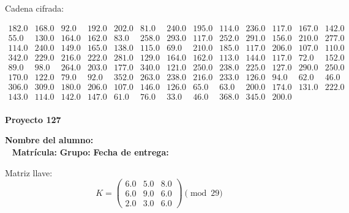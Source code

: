 \documentclass[12pt]{article}
\begin{document}
Cadena cifrada:
\begin{center}
$\begin{array}{lllllllllllll}
182.0 & 168.0 & 92.0 & 192.0 & 202.0 & 81.0 & 240.0 & 195.0 & 114.0 & 236.0 & 117.0 & 167.0 & 142.0\\
55.0 & 130.0 & 164.0 & 162.0 & 83.0 & 258.0 & 293.0 & 117.0 & 252.0 & 291.0 & 156.0 & 210.0 & 277.0\\
114.0 & 240.0 & 149.0 & 165.0 & 138.0 & 115.0 & 69.0 & 210.0 & 185.0 & 117.0 & 206.0 & 107.0 & 110.0\\
342.0 & 229.0 & 216.0 & 222.0 & 281.0 & 129.0 & 164.0 & 162.0 & 113.0 & 144.0 & 117.0 & 72.0 & 152.0\\
89.0 & 98.0 & 264.0 & 203.0 & 177.0 & 340.0 & 121.0 & 250.0 & 238.0 & 225.0 & 127.0 & 290.0 & 250.0\\
170.0 & 122.0 & 79.0 & 92.0 & 352.0 & 263.0 & 238.0 & 216.0 & 233.0 & 126.0 & 94.0 & 62.0 & 46.0\\
306.0 & 309.0 & 180.0 & 206.0 & 107.0 & 146.0 & 126.0 & 65.0 & 63.0 & 200.0 & 174.0 & 131.0 & 222.0\\
143.0 & 114.0 & 142.0 & 147.0 & 61.0 & 76.0 & 33.0 & 46.0 & 368.0 & 345.0 & 200.0\\
\end{array}$
\end{center}

\newpage


\textbf{Proyecto 127}

\textbf{Nombre del alumno:} \underline{\hspace{13cm}}\\\
\vspace{1cm}
\textbf{Matrícula:} \underline{\hspace{4cm}} \hspace{1cm}
\textbf{Grupo:} \underline{\hspace{2cm}}
\textbf{Fecha de entrega:} \underline{\hspace{2cm}}

\medskip

Matriz llave:
\[
K = \begin{pmatrix}
6.0 & 5.0 & 8.0\\
6.0 & 9.0 & 6.0\\
2.0 & 3.0 & 6.0
\end{pmatrix} \pmod{29}
\]
\end{document}
